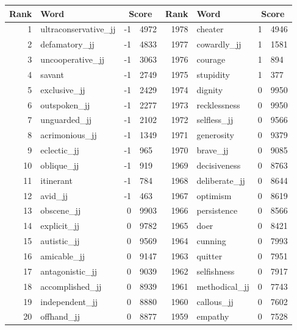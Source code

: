 \begin{table}[tbp]
    \begin{tabular}{| rlr@{.}l | rlr@{.}l |}
    \hline
    \textbf{Rank} & \textbf{Word} & \multicolumn{2}{c|}{\textbf{Score}} & \textbf{Rank} & \textbf{Word} & \multicolumn{2}{c|}{\textbf{Score}} \\
    \hline
    1 & ultraconservative\_jj & -1 & 4972    &    1978 & cheater & 1 & 4946 \\
    2 & defamatory\_jj & -1 & 4833    &    1977 & cowardly\_jj & 1 & 1581 \\
    3 & uncooperative\_jj & -1 & 3063    &    1976 & courage & 1 & 894 \\
    4 & savant & -1 & 2749    &    1975 & stupidity & 1 & 377 \\
    5 & exclusive\_jj & -1 & 2429    &    1974 & dignity & 0 & 9950 \\
    6 & outspoken\_jj & -1 & 2277    &    1973 & recklessness & 0 & 9950 \\
    7 & unguarded\_jj & -1 & 2102    &    1972 & selfless\_jj & 0 & 9566 \\
    8 & acrimonious\_jj & -1 & 1349    &    1971 & generosity & 0 & 9379 \\
    9 & eclectic\_jj & -1 & 965    &    1970 & brave\_jj & 0 & 9085 \\
    10 & oblique\_jj & -1 & 919    &    1969 & decisiveness & 0 & 8763 \\
    11 & itinerant & -1 & 784    &    1968 & deliberate\_jj & 0 & 8644 \\
    12 & avid\_jj & -1 & 463    &    1967 & optimism & 0 & 8619 \\
    13 & obscene\_jj & 0 & 9903    &    1966 & persistence & 0 & 8566 \\
    14 & explicit\_jj & 0 & 9782    &    1965 & doer & 0 & 8421 \\
    15 & autistic\_jj & 0 & 9569    &    1964 & cunning & 0 & 7993 \\
    16 & amicable\_jj & 0 & 9147    &    1963 & quitter & 0 & 7951 \\
    17 & antagonistic\_jj & 0 & 9039    &    1962 & selfishness & 0 & 7917 \\
    18 & accomplished\_jj & 0 & 8939    &    1961 & methodical\_jj & 0 & 7743 \\
    19 & independent\_jj & 0 & 8880    &    1960 & callous\_jj & 0 & 7602 \\
    20 & offhand\_jj & 0 & 8877    &    1959 & empathy & 0 & 7528 \\

\end{tabular}
\end{table}

